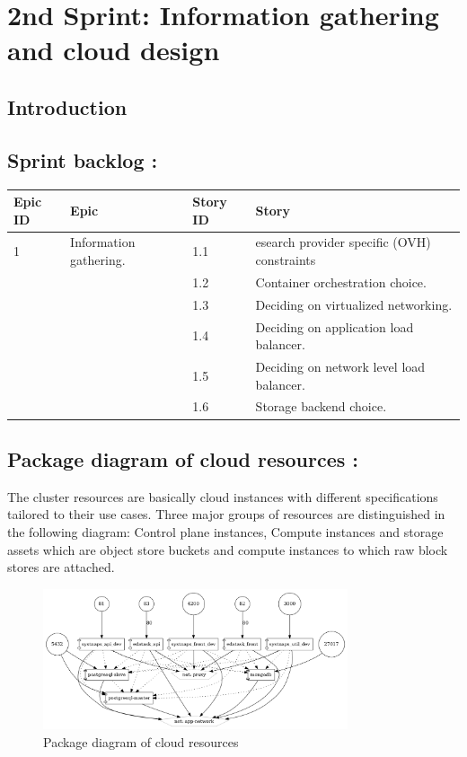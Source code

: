 \graphicspath{{./assets/}}
\setcounter{mtc}{4}
\chapter{2nd Sprint: Information gathering and cloud design }
\minitoc
\newpage

\section*{Introduction}
\section{Sprint backlog :}

\begin{longtable}[!ht]{|m{1.5cm}|m{3cm}|m{1.5cm}|m{9cm}|}
\hline
{\textbf{Epic ID}} & {\textbf{Epic}} & {\textbf{Story ID}} & {\textbf{Story}}\\
\hline
1  & Information gathering.	 &  1.1	 &  esearch provider specific (OVH) constraints\\
\cline{3-4}
& & 1.2 & Container orchestration choice. \\
\cline{3-4}
& & 1.3	& Deciding on virtualized networking. \\
\cline{3-4}
& & 1.4	& Deciding on application load balancer. \\
\cline{3-4}
& & 1.5	& Deciding on network level load balancer. \\
\cline{3-4}
& & 1.6	& Storage backend choice.\\
\hline
\end{longtable}


\section{Package diagram of cloud resources :}

The cluster resources are basically cloud instances with different specifications tailored to their use cases. Three major groups of resources are distinguished in the following diagram: Control plane instances, Compute instances and storage assets which are object store buckets and compute instances to which raw block stores are attached.

\begin{figure}[!ht]\centering
\includegraphics[width=0.8\textwidth,angle=00]{assets/f10.png}
\caption{Package diagram of cloud resources }
\label{fig:f10}
\end{figure}

